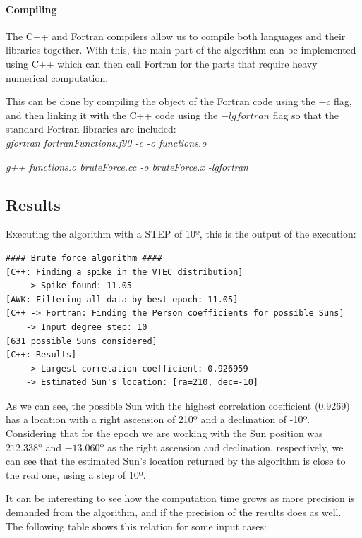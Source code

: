 \paragraph{Compiling}

The C++ and Fortran compilers allow us to compile both languages and their libraries together. With this, the main part of the algorithm can be implemented using C++ which can then call Fortran for the parts that require heavy numerical computation.

This can be done by compiling the object of the Fortran code using the $-c$ flag, and then linking it with the C++ code using the $-lgfortran$ flag so that the standard Fortran libraries are included: \\

\textit{gfortran fortranFunctions.f90 -c -o functions.o}
	
\textit{g++ functions.o bruteForce.cc -o bruteForce.x -lgfortran}

\subsection{Results}

Executing the algorithm with a STEP of 10º, this is the output of the execution:

\begin{lstlisting}[caption=Brute force approach algorithm output]
#### Brute force algorithm ####
[C++: Finding a spike in the VTEC distribution]
	-> Spike found: 11.05
[AWK: Filtering all data by best epoch: 11.05]
[C++ -> Fortran: Finding the Person coefficients for possible Suns]
	-> Input degree step: 10
[631 possible Suns considered]
[C++: Results]
	-> Largest correlation coefficient: 0.926959
	-> Estimated Sun's location: [ra=210, dec=-10]
\end{lstlisting}

As we can see, the possible Sun with the highest correlation coefficient (0.9269) has a location with a right ascension of 210º and a declination of -10º. Considering that for the epoch we are working with the Sun position was $212.338º$ and $-13.060º$ as the right ascension and declination, respectively, we can see that the estimated Sun's location returned by the algorithm is close to the real one, using a step of 10º.

It can be interesting to see how the computation time grows as more precision is demanded from the algorithm, and if the precision of the results does as well. The following table shows this relation for some input cases:

